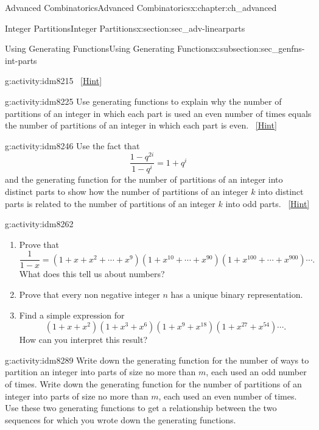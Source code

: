 \documentclass[oneside,10pt,]{book}
\numberwithin{equation}{chapter}
\begin{document}
\begin{chapterptx}{Advanced Combinatorics}{}{Advanced Combinatorics}{}{}{x:chapter:ch_advanced}
\begin{sectionptx}{Integer Partitions}{}{Integer Partitions}{}{}{x:section:sec_adv-linearparts}
\begin{subsectionptx}{Using Generating Functions}{}{Using Generating Functions}{}{}{x:subsection:sec_genfns-int-parts}
\begin{activity}{}{g:activity:idm8215}
\qquad~\hfill{\tiny\hyperlink{g:hint:idm8219-back}{[Hint]}}\end{activity}
\begin{activity}{}{g:activity:idm8225}%
Use generating functions to explain why the number of partitions of an integer in which each part is used an even number of times equals the number of partitions of an integer in which each part is even.%
\qquad~\hfill{\tiny\hyperlink{g:hint:idm8228-back}{[Hint]}}\end{activity}
\begin{activity}{}{g:activity:idm8246}%
Use the fact that%
\begin{equation*}
\frac{1-q^{2i}}{1-q^i}= 1+q^i
\end{equation*}
and the generating function for the number of partitions of an integer into distinct parts to show how the number of partitions of an integer \(k\) into distinct parts is related to the number of partitions of an integer \(k\) into odd parts.%
\qquad~\hfill{\tiny\hyperlink{g:hint:idm8252-back}{[Hint]}}\end{activity}
\begin{activity}{}{g:activity:idm8262}%
\begin{enumerate}[font=\bfseries,label=(\alph*),ref=\alph*]
\item{}Prove that%
\begin{equation*}
\frac{1}{1-x} = (1 + x + x^2 +\cdots + x^9)(1 + x^{10} + \cdots + x^{90})(1 + x^{100} + \cdots + x^{900})\cdots.
\end{equation*}
What does this tell us about numbers?%
\item{}Prove that every non negative integer \(n\) has a unique binary representation.%
\item{}Find a simple expression for%
\begin{equation*}
(1+x+x^2)(1+x^3+x^6)(1+x^9+x^{18})(1+x^{27}+x^{54})\cdots.
\end{equation*}
How can you interpret this result?%
\end{enumerate}
\end{activity}
\begin{activity}{}{g:activity:idm8289}%
Write down the generating function for the number of ways to partition an integer into parts of size no more than \(m\), each used an odd number of times. Write down the generating function for the number of partitions of an integer into parts of size no more than \(m\), each used an even number of times. Use these two generating functions to get a relationship between the two sequences for which you wrote down the generating functions.%

\end{activity}
\end{subsectionptx}
\end{sectionptx}
\end{chapterptx}
\end{document}
